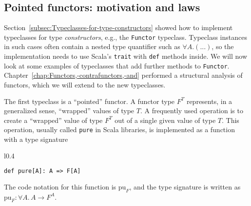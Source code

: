 \subsection{Pointed functors: motivation and laws\label{subsec:Pointed-functors-motivation-equivalence}}

Section~\ref{subsec:Typeclasses-for-type-constructors} showed how
to implement typeclasses for type \emph{constructors}, e.g., the \lstinline!Functor!
typeclass. Typeclass instances in such cases often contain a nested
type quantifier such as $\forall A.\left(...\right)$, so the implementation
needs to use Scala\textsf{'}s \lstinline!trait! with \lstinline!def! methods
inside. We will now look at some examples of typeclasses that add
further methods to \lstinline!Functor!. Chapter~\ref{chap:Functors,-contrafunctors,-and}
performed a structural analysis of functors, which we will extend
to the new typeclasses.

The first typeclass is a \textsf{``}pointed\textsf{''} functor. A functor type $F^{T}$
represents, in a generalized sense, \textsf{``}wrapped\textsf{''} values of type $T$.
A frequently used operation is to create a \textsf{``}wrapped\textsf{''} value of
type $F^{T}$ out of a single given value of type $T$. This operation,
usually called \lstinline!pure! in Scala libraries, is implemented
as a function with a type signature

\begin{wrapfigure}{l}{0.4\columnwidth}%
\vspace{-0.8\baselineskip}
\begin{lstlisting}
def pure[A]: A => F[A]
\end{lstlisting}
\vspace{-0.8\baselineskip}
\end{wrapfigure}%

\noindent The code notation for this function is $\text{pu}_{F}$,
and the type signature is written as $\text{pu}_{F}:\forall A.\,A\rightarrow F^{A}$. 

